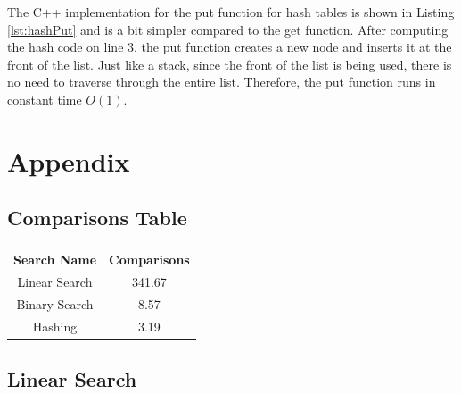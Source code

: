 \documentclass[letterpaper, 10pt,DIV=13]{scrartcl}
\numberwithin{equation}{section} %
\numberwithin{figure}{section} %
\numberwithin{table}{section} %
\begin{document}
The C++ implementation for the put function for hash tables is shown in Listing \ref{lst:hashPut} and is a bit simpler compared to the get function. After computing the hash code on line 3, the put function creates a new node and inserts it at the front of the list. Just like a stack, since the front of the list is being used, there is no need to traverse through the entire list. Therefore, the put function runs in constant time $O(1)$.

\section{Appendix}
\subsection{Comparisons Table}\label{comparisonsTable}
\begin{center}
  \begin{tabular}{|c|c|}
    \hline
    Search Name & Comparisons \\
    \hline
    Linear Search & 341.67 \\
    \hline
    Binary Search & 8.57 \\
    \hline
    Hashing & 3.19 \\
    \hline
  \end{tabular}
\end{center}

\lstset{numbers=left, numberstyle=\tiny, stepnumber=1, numbersep=5pt}


\subsection{Linear Search}

\end{document}
